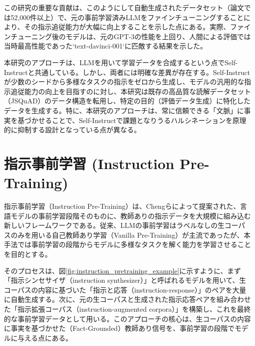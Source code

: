 \documentclass[a4paper,11pt]{jreport}
\begin{document}
この研究の重要な貢献は、このようにして自動生成されたデータセット（論文では52,000件以上）で、元の事前学習済みLLMをファインチューニングすることにより、その指示追従能力が大幅に向上することを示した点にある。実際、ファインチューニング後のモデルは、元のGPT-3の性能を上回り、人間による評価では当時最高性能であった`text-davinci-001`に匹敵する結果を示した\cite{Self-Instruct}。

本研究のアプローチは、LLMを用いて学習データを合成するという点でSelf-Instructと共通している。しかし、両者には明確な差異が存在する。Self-Instructが少数のシードから多様なタスクの指示をゼロから生成し、モデルの汎用的な指示追従能力の向上を目指すのに対し、本研究は既存の高品質な読解データセット（JSQuAD）のデータ構造を転用し、特定の目的（評価データ生成）に特化したデータを生成する。特に、本研究のアプローチは、常に信頼できる「文脈」に事実を基づかせることで、Self-Instructで課題となりうるハルシネーションを原理的に抑制する設計となっている点が異なる。

\section{指示事前学習 (Instruction Pre-Training)}

指示事前学習（Instruction Pre-Training）は、Chengらによって提案された\cite{Instruction Pre-Training}、言語モデルの事前学習段階そのものに、教師ありの指示データを大規模に組み込む新しいフレームワークである。従来、LLMの事前学習はラベルなしの生コーパスのみを用いる自己教師あり学習（Vanilla Pre-Training）が主流であったが、本手法では事前学習の段階からモデルに多様なタスクを解く能力を学習させることを目的とする。

そのプロセスは、図\ref{fig:instruction_pretraining_example}に示すように、まず「指示シンセサイザ（instruction synthesizer）」と呼ばれるモデルを用いて、生コーパスの内容に基づいた「指示と応答（instruction-response）」のペアを大量に自動生成する。次に、元の生コーパスと生成された指示応答ペアを組み合わせた「指示拡張コーパス（instruction-augmented corpora）」を構築し、これを最終的な事前学習データとして用いる。このアプローチの核心は、生コーパスの内容に事実を基づかせた（Fact-Grounded）教師あり信号を、事前学習の段階でモデルに与える点にある。
\end{document}
